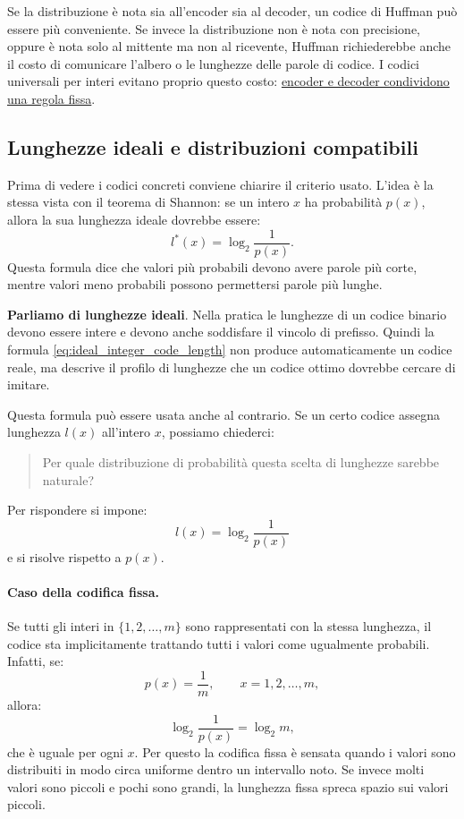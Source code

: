 \documentclass{article}
\theoremstyle{definition}
\numberwithin{equation}{section}
\begin{document}
Se la distribuzione è nota sia all'encoder sia al decoder, un codice di Huffman può essere più conveniente. Se invece la distribuzione non è nota con precisione, oppure è nota solo al mittente ma non al ricevente, Huffman richiederebbe anche il costo di comunicare l'albero o le lunghezze delle parole di codice. I codici universali per interi evitano proprio questo costo: \uline{encoder e decoder condividono una regola fissa}.

\subsection{Lunghezze ideali e distribuzioni compatibili}
Prima di vedere i codici concreti conviene chiarire il criterio usato. L'idea è la stessa vista con il teorema di Shannon: se un intero $x$ ha probabilità $p(x)$, allora la sua lunghezza ideale dovrebbe essere:
\begin{equation}\label{eq:ideal_integer_code_length}
    l^*(x)=\log_2\frac{1}{p(x)}.
\end{equation}
Questa formula dice che valori più probabili devono avere parole più corte, mentre valori meno probabili possono permettersi parole più lunghe.

\textbf{Parliamo di lunghezze ideali}. Nella pratica le lunghezze di un codice binario devono essere intere e devono anche soddisfare il vincolo di prefisso. Quindi la formula \eqref{eq:ideal_integer_code_length} non produce automaticamente un codice reale, ma descrive il profilo di lunghezze che un codice ottimo dovrebbe cercare di imitare.

Questa formula può essere usata anche al contrario. Se un certo codice assegna lunghezza $l(x)$ all'intero $x$, possiamo chiederci:
\begin{quote}
    Per quale distribuzione di probabilità questa scelta di lunghezze sarebbe naturale?
\end{quote}
Per rispondere si impone:
\[
    l(x)=\log_2\frac{1}{p(x)}
\]
e si risolve rispetto a $p(x)$.

\paragraph{Caso della codifica fissa.}
Se tutti gli interi in $\{1,2,\ldots,m\}$ sono rappresentati con la stessa lunghezza, il codice sta implicitamente trattando tutti i valori come ugualmente probabili. Infatti, se:
\[
    p(x)=\frac{1}{m},
    \qquad x=1,2,\ldots,m,
\]
allora:
\[
    \log_2\frac{1}{p(x)}
    =
    \log_2 m,
\]
che è uguale per ogni $x$. Per questo la codifica fissa è sensata quando i valori sono distribuiti in modo circa uniforme dentro un intervallo noto. Se invece molti valori sono piccoli e pochi sono grandi, la lunghezza fissa spreca spazio sui valori piccoli.
\end{document}

